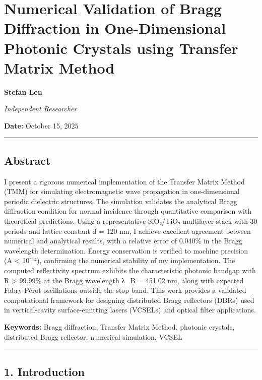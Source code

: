 \documentclass[
]{article}
\author{}
\date{}
\begin{document}
\section{Numerical Validation of Bragg Diffraction in One-Dimensional
Photonic Crystals using Transfer Matrix
Method}\label{numerical-validation-of-bragg-diffraction-in-one-dimensional-photonic-crystals-using-transfer-matrix-method}

\textbf{Stefan Len}

\emph{Independent Researcher}

\textbf{Date:} October 15, 2025

\begin{center}\rule{0.5\linewidth}{0.5pt}\end{center}

\subsection{Abstract}\label{abstract}

I present a rigorous numerical implementation of the Transfer Matrix
Method (TMM) for simulating electromagnetic wave propagation in
one-dimensional periodic dielectric structures. The simulation validates
the analytical Bragg diffraction condition for normal incidence through
quantitative comparison with theoretical predictions. Using a
representative SiO₂/TiO₂ multilayer stack with 30 periods and lattice
constant d = 120 nm, I achieve excellent agreement between numerical and
analytical results, with a relative error of 0.040\% in the Bragg
wavelength determination. Energy conservation is verified to machine
precision (\textbar A\textbar{} \textless{} 10⁻¹⁴), confirming the
numerical stability of my implementation. The computed reflectivity
spectrum exhibits the characteristic photonic bandgap with R
\textgreater{} 99.99\% at the Bragg wavelength λ\_B = 451.02 nm, along
with expected Fabry-Pérot oscillations outside the stop band. This work
provides a validated computational framework for designing distributed
Bragg reflectors (DBRs) used in vertical-cavity surface-emitting lasers
(VCSELs) and optical filter applications.

\textbf{Keywords:} Bragg diffraction, Transfer Matrix Method, photonic
crystals, distributed Bragg reflector, numerical simulation, VCSEL

\begin{center}\rule{0.5\linewidth}{0.5pt}\end{center}

\subsection{1. Introduction}\label{introduction}
\end{document}
